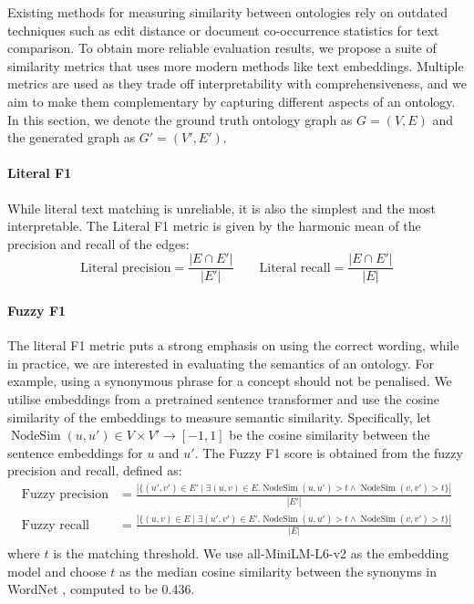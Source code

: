 \documentclass{article}
\DeclareMathOperator{\nodesim}{NodeSim}
\begin{document}
Existing methods for measuring similarity between ontologies rely on outdated techniques such as edit distance or document co-occurrence statistics for text comparison. To obtain more reliable evaluation results, we propose a suite of similarity metrics that uses more modern methods like text embeddings. Multiple metrics are used as they trade off interpretability with comprehensiveness, and we aim to make them complementary by capturing different aspects of an ontology. In this section, we denote the ground truth ontology graph as $G = (V, E)$ and the generated graph as $G' = (V', E')$. 

\paragraph{Literal F1 \cite{Kashyap2005TaxaMinerAE}}
While literal text matching is unreliable, it is also the simplest and the most interpretable. The Literal F1 metric is given by the harmonic mean of the precision and recall of the edges:
\[
\text{Literal precision} = \frac{|E \cap E'|}{|E'|} \qquad
\text{Literal recall} = \frac{|E \cap E'|}{|E|}
\]

\paragraph{Fuzzy F1}
The literal F1 metric puts a strong emphasis on using the correct wording, while in practice, we are interested in evaluating the semantics of an ontology. For example, using a synonymous phrase for a concept should not be penalised. We utilise embeddings from a pretrained sentence transformer and use the cosine similarity of the embeddings to measure semantic similarity. Specifically, let $\nodesim(u, u') \in V \times V' \to [-1, 1]$ be the cosine similarity between the sentence embeddings for $u$ and $u'$. The Fuzzy F1 score is obtained from the fuzzy precision and recall, defined as:
\begin{equation*}
\begin{aligned}
\text{Fuzzy precision} &= \frac{|
\{(u', v') \in E' \mid \exists (u, v) \in E. 
\nodesim(u, u') > t \land \nodesim(v, v') > t
\}
|}{|E'|} \\
\text{Fuzzy recall} &= \frac{|
\{(u, v) \in E \mid \exists (u', v') \in E'. 
\nodesim(u, u') > t \land \nodesim(v, v') > t
\}
|}{|E|} \\
\end{aligned}
\end{equation*}
where $t$ is the matching threshold. We use all-MiniLM-L6-v2 \cite{wang2020minilm,reimers-2019-sentence-bert} as the embedding model and choose $t$ as the median cosine similarity between the synonyms in WordNet \cite{miller1995wordnet}, computed to be 0.436.
\end{document}
